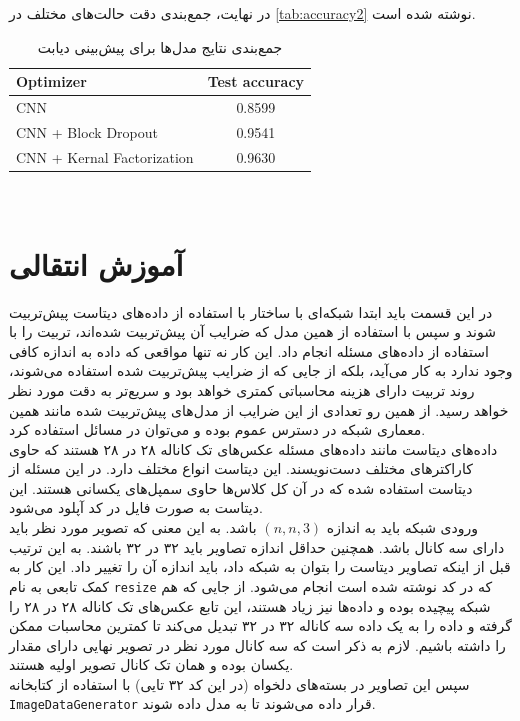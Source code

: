 \documentclass[11pt]{article}
\begin{document}
	در نهایت، جمع‌بندی دقت حالت‌های مختلف در 
	\autoref{tab:accuracy2}
	نوشته شده است.
		\begin{table}[h!]
		\caption{جمع‌بندی نتایج مدل‌ها برای پیش‌بینی دیابت}
		\begin{latin}
			\centering
			\begin{tabular}{|l|c|}
				\hline
				\textbf{Optimizer} &  \textbf{Test accuracy} \\ \hline
				CNN &  0.8599 \\ \hline
				CNN + Block Dropout &  0.9541 \\ \hline
				CNN + Kernal Factorization &  0.9630 \\ \hline
			\end{tabular}
		\end{latin}
		\label{tab:accuracy2} 
	\end{table}\\
	\section{آموزش انتقالی}
	در این قسمت باید ابتدا شبکه‌ای با ساختار  با استفاده از داده‌های دیتاست  پیش‌تربیت شوند و سپس با استفاده از همین مدل که ضرایب آن پیش‌تربیت شده‌اند، تربیت را با استفاده از داده‌های مسئله انجام داد. این کار نه تنها مواقعی که داده به اندازه کافی وجود ندارد به کار می‌آید، بلکه از جایی که از ضرایب پیش‌تربیت شده استفاده می‌شوند، روند تربیت دارای هزینه محاسباتی کمتری خواهد بود و سریع‌تر به دقت مورد نظر خواهد رسید. از همین رو تعدادی از این ضرایب از مدل‌های پیش‌تربیت شده مانند همین معماری شبکه در دسترس عموم بوده و می‌توان در مسائل استفاده کرد.\\
	داده‌های دیتاست  مانند داده‌های مسئله عکس‌های تک کاناله ۲۸ در ۲۸ هستند که حاوی کاراکتر‌های مختلف دست‌نویسند. این دیتاست انواع مختلف دارد. در این مسئله از دیتاست  استفاده شده که در آن کل کلاس‌ها حاوی سمپل‌های یکسانی هستند. این دیتاست به صورت فایل  در کد آپلود می‌شود.\\
	ورودی شبکه  باید به اندازه $(n,n,3)$ باشد. به این معنی که تصویر مورد نظر باید دارای سه کانال باشد. همچنین حداقل اندازه تصاویر باید ۳۲ در ۳۲ باشند. به این ترتیب قبل از اینکه تصاویر دیتاست  را بتوان به شبکه داد، باید اندازه آن را تغییر داد. این کار به کمک تابعی به نام 
	\verb|resize| 
	که در کد نوشته شده است انجام می‌شود. از جایی که هم شبکه پیچیده بوده و داده‌ها نیز زیاد هستند، این تابع عکس‌های تک کاناله ۲۸ در ۲۸ را گرفته و داده را به یک داده سه کاناله ۳۲ در ۳۲ تبدیل می‌کند تا کمترین محاسبات ممکن را داشته باشیم. لازم به ذکر است که سه کانال مورد نظر در تصویر نهایی دارای مقدار یکسان بوده و همان تک کانال تصویر اولیه هستند.\\
	سپس این تصاویر در بسته‌های دلخواه (در این کد ۳۲ تایی) با استفاده از کتابخانه 
	\verb|ImageDataGenerator|
	قرار داده می‌شوند تا به مدل داده شوند.
	
\end{document}
